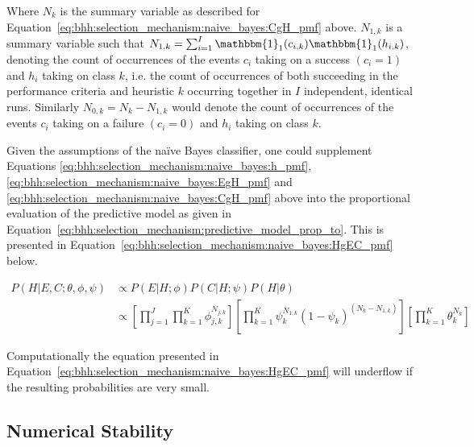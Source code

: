 Where $N_{k}$ is the summary variable as described for Equation~\eqref{eq:bhh:selection_mechanism:naive_bayes:CgH_pmf} above.
$N_{1,k}$ is a summary variable such that $N_{1,k} = \sum_{i=1}^{I}
      \mathbbm{1}_{1}(c_{i,k})\mathbbm{1}_{1}(h_{i,k})$, denoting the count of
occurrences of the events $c_{i}$ taking on a success $(c_{i}=1)$ and $h_{i}$
taking on class $k$, i.e. the count of occurrences of both succeeding in the
performance criteria and heuristic $k$ occurring together in $I$ independent,
identical runs. Similarly $N_{0,k} = N_{k} - N_{1,k}$ would denote the count of
occurrences of the events $c_{i}$ taking on a failure $(c_{i}=0)$ and $h_{i}$
taking on class $k$.


Given the assumptions of the naïve Bayes classifier, one could supplement Equations \ref{eq:bhh:selection_mechanism:naive_bayes:h_pmf}, \ref{eq:bhh:selection_mechanism:naive_bayes:EgH_pmf} and \ref{eq:bhh:selection_mechanism:naive_bayes:CgH_pmf} above into the proportional evaluation of the predictive model as given in Equation~\eqref{eq:bhh:selection_mechanism:predictive_model_prop_to}. This is presented in Equation~\eqref{eq:bhh:selection_mechanism:naive_bayes:HgEC_pmf} below.

\begin{equation}
      \label{eq:bhh:selection_mechanism:naive_bayes:HgEC_pmf}
      \begin{split}
            P(H \vert E, C;  \theta, \phi, \psi)
            &\propto P(E \vert H;  \phi)  P(C \vert H;  \psi) P(H \vert \theta)  \\
            &\propto \left[ \prod_{j=1}^{J} \prod_{k=1}^{K} \phi_{j,k}^{N_{j,k}} \right] \left[ \prod_{k=1}^{K} \psi_{k}^{N_{1,k}} (1 - \psi_{k})^{(N_{k} - N_{1,k})} \right] \left[ \prod_{k=1}^{K} \theta_{k}^{N_{k}} \right]
      \end{split}
\end{equation}

Computationally the equation presented in Equation~\eqref{eq:bhh:selection_mechanism:naive_bayes:HgEC_pmf} will underflow if the resulting probabilities are very small.


\subsection{Numerical Stability}
\label{sec:bhh:selection_mechanism:numerical_stability}

